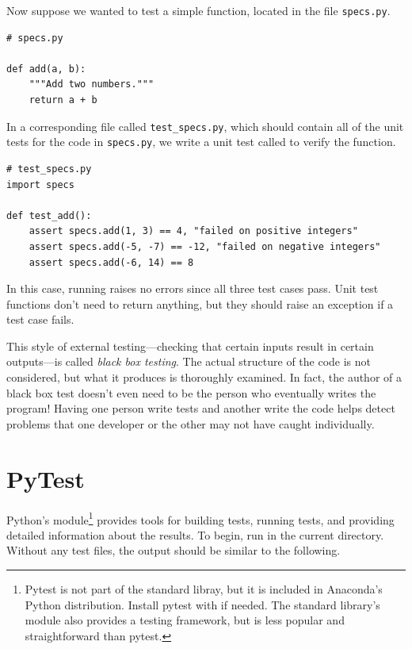 Now suppose we wanted to test a simple  function, located in the file \texttt{specs.py}.

\begin{lstlisting}
# specs.py

def add(a, b):
    """Add two numbers."""
    return a + b
\end{lstlisting}

In a corresponding file called \texttt{test\_specs.py}, which should contain all of the unit tests for the code in \texttt{specs.py}, we write a unit test called  to verify the  function.

\begin{lstlisting}
# test_specs.py
import specs

def test_add():
    assert specs.add(1, 3) == 4, "failed on positive integers"
    assert specs.add(-5, -7) == -12, "failed on negative integers"
    assert specs.add(-6, 14) == 8
\end{lstlisting}

In this case, running  raises no errors since all three test cases pass.
Unit test functions don't need to return anything, but they should raise an exception if a test case fails.

\begin{info} %
This style of external testing---checking that certain inputs result in certain outputs---is called \emph{black box testing}.
The actual structure of the code is not considered, but what it produces is thoroughly examined.
In fact, the author of a black box test doesn't even need to be the person who eventually writes the program!
Having one person write tests and another write the code helps detect problems that one developer or the other may not have caught individually.
\end{info}

\section*{PyTest} %

Python's  module\footnote{Pytest is not part of the standard libray, but it is included in Anaconda's Python distribution. Install pytest with  if needed. The standard library's  module also provides a testing framework, but is less popular and straightforward than pytest.} provides tools for building tests, running tests, and providing detailed information about the results.
To begin, run  in the current directory.
Without any test files, the output should be similar to the following.

